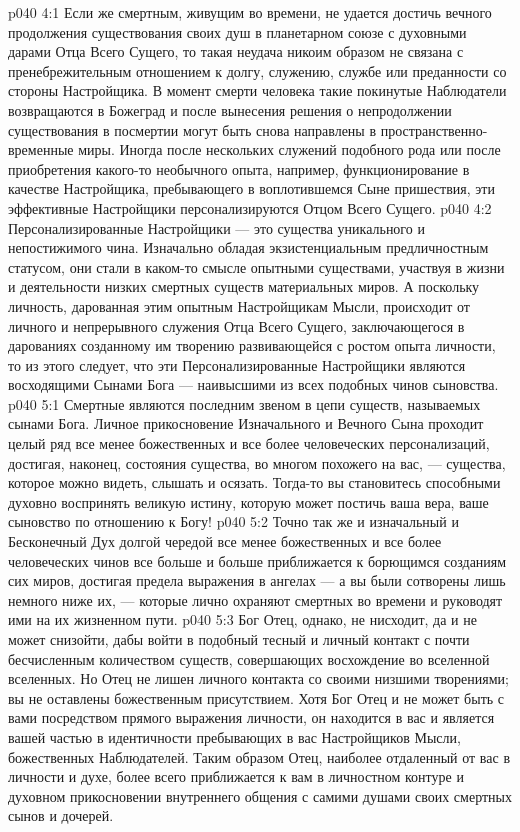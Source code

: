 \vs p040 4:1 Если же смертным, живущим во времени, не удается достичь вечного продолжения существования своих душ в планетарном союзе с духовными дарами Отца Всего Сущего, то такая неудача никоим образом не связана с пренебрежительным отношением к долгу, служению, службе или преданности со стороны Настройщика. В момент смерти человека такие покинутые Наблюдатели возвращаются в Божеград и после вынесения решения о непродолжении существования в посмертии могут быть снова направлены в пространственно\hyp{}временные миры. Иногда после нескольких служений подобного рода или после приобретения какого\hyp{}то необычного опыта, например, функционирование в качестве Настройщика, пребывающего в воплотившемся Сыне пришествия, эти эффективные Настройщики персонализируются Отцом Всего Сущего.
\vs p040 4:2 Персонализированные Настройщики --- это существа уникального и непостижимого чина. Изначально обладая экзистенциальным предличностным статусом, они стали в каком\hyp{}то смысле опытными существами, участвуя в жизни и деятельности низких смертных существ материальных миров. А поскольку личность, дарованная этим опытным Настройщикам Мысли, происходит от личного и непрерывного служения Отца Всего Сущего, заключающегося в дарованиях созданному им творению развивающейся с ростом опыта личности, то из этого следует, что эти Персонализированные Настройщики являются восходящими Сынами Бога --- наивысшими из всех подобных чинов сыновства.
\vs p040 5:1 Смертные являются последним звеном в цепи существ, называемых сынами Бога. Личное прикосновение Изначального и Вечного Сына проходит целый ряд все менее божественных и все более человеческих персонализаций, достигая, наконец, состояния существа, во многом похожего на вас, --- существа, которое можно видеть, слышать и осязать. Тогда\hyp{}то вы становитесь способными духовно воспринять великую истину, которую может постичь ваша вера, ваше сыновство по отношению к Богу!
\vs p040 5:2 Точно так же и изначальный и Бесконечный Дух долгой чередой все менее божественных и все более человеческих чинов все больше и больше приближается к борющимся созданиям сих миров, достигая предела выражения в ангелах --- а вы были сотворены лишь немного ниже их, --- которые лично охраняют смертных во времени и руководят ими на их жизненном пути.
\vs p040 5:3 Бог Отец, однако, не нисходит, да и не может снизойти, дабы войти в подобный тесный и личный контакт с почти бесчисленным количеством существ, совершающих восхождение во вселенной вселенных. Но Отец не лишен личного контакта со своими низшими творениями; вы не оставлены божественным присутствием. Хотя Бог Отец и не может быть с вами посредством прямого выражения личности, он находится в вас и является вашей частью в идентичности пребывающих в вас Настройщиков Мысли, божественных Наблюдателей. Таким образом Отец, наиболее отдаленный от вас в личности и духе, более всего приближается к вам в личностном контуре и духовном прикосновении внутреннего общения с самими душами своих смертных сынов и дочерей.
